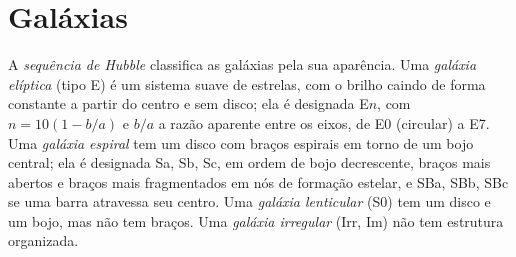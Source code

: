 \section{Galáxias}\label{sec:b3:milky-way-galaxies:galaxies}

\begin{definition}\label{def:b3:milky-way-galaxies:types}
A \emph{sequência de Hubble} classifica as galáxias pela
sua aparência. Uma \emph{galáxia elíptica}
(tipo E) é um sistema suave de estrelas, com o brilho caindo de forma constante
a partir do centro e sem disco; ela é designada E$n$, com $n = 10(1 - b/a)$
e $b/a$ a razão aparente entre os eixos, de E0 (circular) a E7. Uma
\emph{galáxia espiral} tem um disco com braços espirais
em torno de um bojo central; ela é designada Sa, Sb, Sc, em ordem de bojo decrescente,
braços mais abertos e braços mais fragmentados em nós de formação estelar, e
SBa, SBb, SBc se uma barra atravessa seu centro. Uma \emph{galáxia
lenticular} (S0) tem um disco e um bojo, mas não tem braços.
Uma \emph{galáxia irregular} (Irr, Im) não tem
estrutura organizada.
\end{definition}

